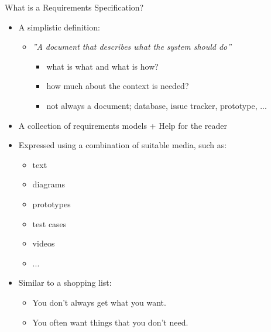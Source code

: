 
\begin{Slide}{What is a Requirements Specification?}

\begin{itemize}
\item A simplistic definition:  
\begin{itemize}
\item \textit{''A document that describes what the system should do''}
\begin{itemize}
\item what is what and what is how?
\item how much about the context is needed?
\item not always a document; database, issue tracker, prototype, ...

\end{itemize}
\end{itemize}
\item A collection of requirements models + Help for the reader

\item Expressed using a combination of suitable media, such as:
\begin{itemize}
\item text
\item diagrams
\item prototypes
\item test cases
\item videos
\item ...

\end{itemize}
\item Similar to a shopping list:
\begin{itemize}
\item You don't always get what you want.
\item You often want things that you don't need.

\end{itemize}
\end{itemize}
\end{Slide}